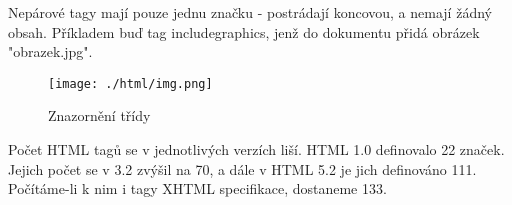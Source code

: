 \documentclass[main.tex]{subfiles}
\begin{document}
Nepárové tagy mají pouze jednu značku - postrádají koncovou, a nemají žádný obsah. Příkladem buď tag includegraphics, jenž do dokumentu přidá obrázek "obrazek.jpg".
		\begin{figure}[h]
			\centering
			\texttt{[image: ./html/img.png]}
			\caption{Znazornění třídy}
		\end{figure}

Počet HTML tagů se v jednotlivých verzích liší. HTML 1.0 definovalo 22 značek. Jejich počet se v 3.2 zvýšil na 70, a dále v HTML 5.2 je jich definováno 111. Počítáme-li k nim i tagy XHTML specifikace, dostaneme 133. \cite{web:wik:cz:html}
\end{document}
